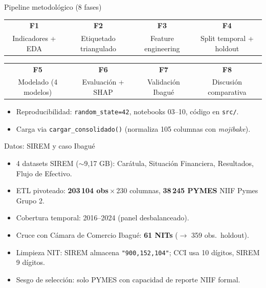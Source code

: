 \documentclass[10pt, aspectratio=169, xcolor=dvipsnames]{beamer}
\begin{document}
\begin{frame}{Pipeline metodol\'ogico (8 fases)}
\centering
\small
\setlength{\tabcolsep}{4pt}
\renewcommand{\arraystretch}{1.15}
\begin{tabular}{@{}c@{ $\to$ }c@{ $\to$ }c@{ $\to$ }c@{}}
\toprule
\textbf{F1} & \textbf{F2} & \textbf{F3} & \textbf{F4} \\
Indicadores + EDA & Etiquetado triangulado & Feature engineering & Split temporal + holdout \\
\bottomrule
\end{tabular}
\vspace{0.3cm}
\begin{tabular}{@{}c@{ $\to$ }c@{ $\to$ }c@{ $\to$ }c@{}}
\toprule
\textbf{F5} & \textbf{F6} & \textbf{F7} & \textbf{F8} \\
Modelado (4 modelos) & Evaluaci\'on + SHAP & Validaci\'on Ibagu\'e & Discusi\'on comparativa \\
\bottomrule
\end{tabular}
\medskip
\begin{itemize}
  \item Reproducibilidad: \texttt{random\_state=42}, notebooks 03--10, c\'odigo en \texttt{src/}.
  \item Carga via \texttt{cargar\_consolidado()} (normaliza 105 columnas con \emph{mojibake}).
\end{itemize}
\end{frame}

\begin{frame}{Datos: SIREM y caso Ibagu\'e}
\begin{itemize}
  \item 4 datasets SIREM ($\sim$9,17 GB): Car\'atula, Situaci\'on Financiera, Resultados, Flujo de Efectivo.
  \item ETL pivoteado: \textbf{203\,104 obs}\,$\times$\,230 columnas, \textbf{38\,245 PYMES} NIIF Pymes Grupo 2.
  \item Cobertura temporal: 2016--2024 (panel desbalanceado).
  \item Cruce con C\'amara de Comercio Ibagu\'e: \textbf{61 NITs} ($\to$ 359 obs.\ holdout).
  \item Limpieza NIT: SIREM almacena \texttt{"900,152,104"}; CCI usa 10 d\'igitos, SIREM 9 d\'igitos.
  \item Sesgo de selecci\'on: solo PYMES con capacidad de reporte NIIF formal.
\end{itemize}
\end{frame}
\end{document}
